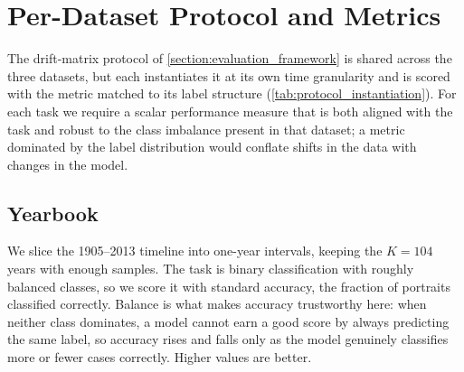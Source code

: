 \section{Per-Dataset Protocol and Metrics}
\label{appendix:evaluation_metrics}
The drift-matrix protocol of \cref{section:evaluation_framework} is shared across the three datasets, but each instantiates it at its own time granularity and is scored with the metric matched to its label structure (\cref{tab:protocol_instantiation}). For each task we require a scalar performance measure that is both aligned with the task and robust to the class imbalance present in that dataset; a metric dominated by the label distribution would conflate shifts in the data with changes in the model.

\begin{table}[htbp]
\caption{Per-dataset instantiation of the drift-matrix protocol: time span, slice granularity, number of slices $K$, and primary metric.}
\label{tab:protocol_instantiation}
\centering
\end{table}

\subsection{Yearbook}
\label{app:metrics_yearbook}
We slice the 1905--2013 timeline into one-year intervals, keeping the $K = 104$ years with enough samples. The task is binary classification with roughly balanced classes, so we score it with standard accuracy, the fraction of portraits classified correctly. Balance is what makes accuracy trustworthy here: when neither class dominates, a model cannot earn a good score by always predicting the same label, so accuracy rises and falls only as the model genuinely classifies more or fewer cases correctly. Higher values are better.

